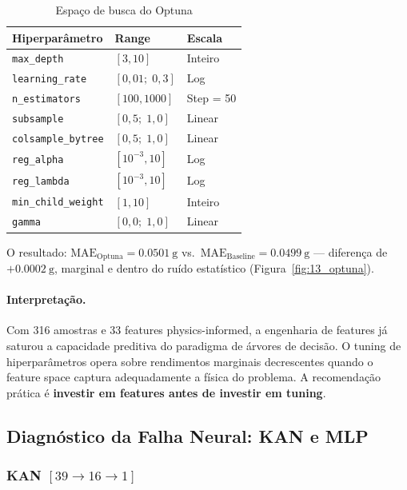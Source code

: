 \documentclass[12pt, a4paper]{article}
\newcommand{\mae}{\text{MAE}}
\begin{document}
\begin{table}[H]
\centering
\caption{Espaço de busca do Optuna}
\label{tab:optuna_space}
\begin{tabular}{@{}lll@{}}
\toprule
\textbf{Hiperparâmetro} & \textbf{Range} & \textbf{Escala} \\
\midrule
\texttt{max\_depth}        & $[3, 10]$       & Inteiro \\
\texttt{learning\_rate}    & $[0{,}01;\; 0{,}3]$ & Log \\
\texttt{n\_estimators}     & $[100, 1000]$   & Step = 50 \\
\texttt{subsample}         & $[0{,}5;\; 1{,}0]$  & Linear \\
\texttt{colsample\_bytree} & $[0{,}5;\; 1{,}0]$  & Linear \\
\texttt{reg\_alpha}        & $[10^{-3}, 10]$   & Log \\
\texttt{reg\_lambda}       & $[10^{-3}, 10]$   & Log \\
\texttt{min\_child\_weight}& $[1, 10]$       & Inteiro \\
\texttt{gamma}             & $[0{,}0;\; 1{,}0]$  & Linear \\
\bottomrule
\end{tabular}
\end{table}

O resultado: $\mae_{\text{Optuna}} = \SI{0,0501}{\gram}$ vs.\
$\mae_{\text{Baseline}} = \SI{0,0499}{\gram}$ --- diferença de
$+\SI{0,0002}{\gram}$, marginal e dentro do ruído estatístico
(Figura~\ref{fig:13_optuna}).

\paragraph{Interpretação.} Com 316 amostras e 33 features
physics-informed, a engenharia de features já saturou a
capacidade preditiva do paradigma de árvores de decisão. O tuning
de hiperparâmetros opera sobre rendimentos marginais decrescentes
quando o feature space captura adequadamente a física do problema.
A recomendação prática é \textbf{investir em features antes de
investir em tuning}.

\subsection{Diagnóstico da Falha Neural: KAN e MLP}

\subsubsection{KAN $[39 \to 16 \to 1]$}
\end{document}
